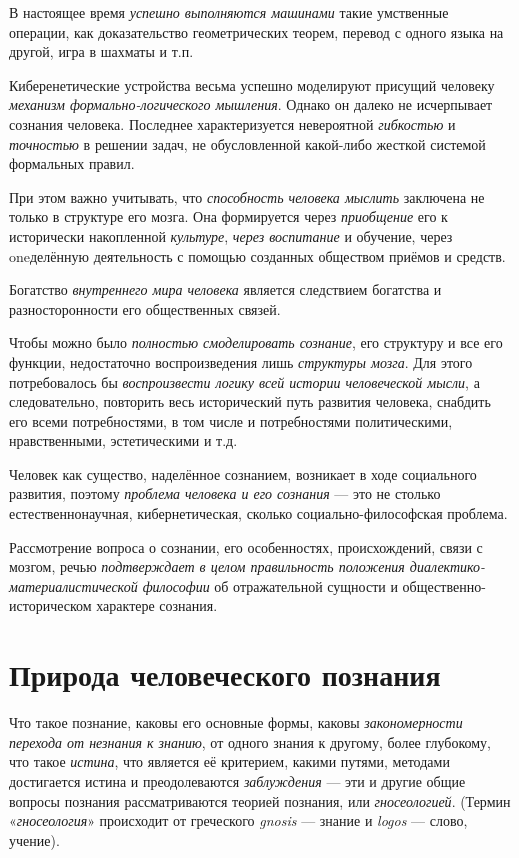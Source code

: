 \documentclass[a4paper,14pt,russian]{extreport}
\begin{document}
В настоящее время \emph{успешно выполняются машинами} такие умственные операции, как доказательство геометрических теорем, перевод с одного языка на другой, игра в шахматы и т.п.

Киберенетические устройства весьма успешно моделируют присущий человеку \emph{механизм формально-логического мышления}. Однако он далеко не исчерпывает сознания человека. Последнее характеризуется невероятной \emph{гибкостью} и \emph{точностью} в решении задач, не обусловленной какой-либо жесткой системой формальных правил.

При этом важно учитывать, что \emph{способность человека мыслить} заключена не только в структуре его мозга. Она формируется через \emph{приобщение} его к исторически накопленной \emph{культуре}, \emph{через воспитание} и обучение, через oneделённую деятельность с помощью созданных обществом приёмов и средств.

Богатство \emph{внутреннего мира человека} является следствием богатства и разносторонности его общественных связей.

Чтобы можно было \emph{полностью смоделировать сознание}, его структуру и все его функции, недостаточно воспроизведения лишь \emph{структуры мозга}. Для этого потребовалось бы \emph{воспроизвести логику всей истории человеческой мысли}, а следовательно, повторить весь исторический путь развития человека, снабдить его всеми потребностями, в том числе и потребностями политическими, нравственными, эстетическими и т.д.

Человек как существо, наделённое сознанием, возникает в ходе социального развития, поэтому \emph{проблема человека и его сознания} --- это не столько естественнонаучная, кибернетическая, сколько социально-философская проблема.

Рассмотрение вопроса о сознании, его особенностях, происхождений, связи с мозгом, речью \emph{подтверждает в целом правильность положения диалектико-материалистической философии} об отражательной сущности и общественно-историческом характере сознания.

\section{Природа человеческого познания}

Что такое познание, каковы его основные формы, каковы \emph{закономерности перехода от незнания к знанию}, от одного знания к другому, более глубокому, что такое \emph{истина}, что является её критерием, какими путями, методами достигается истина и преодолеваются \emph{заблуждения} --- эти и другие общие вопросы познания рассматриваются теорией познания, или \emph{гносеологией}. (Термин «\emph{гносеология}» происходит от греческого \emph{gnosis} --- знание и \emph{logos} --- слово, учение).
\end{document}
